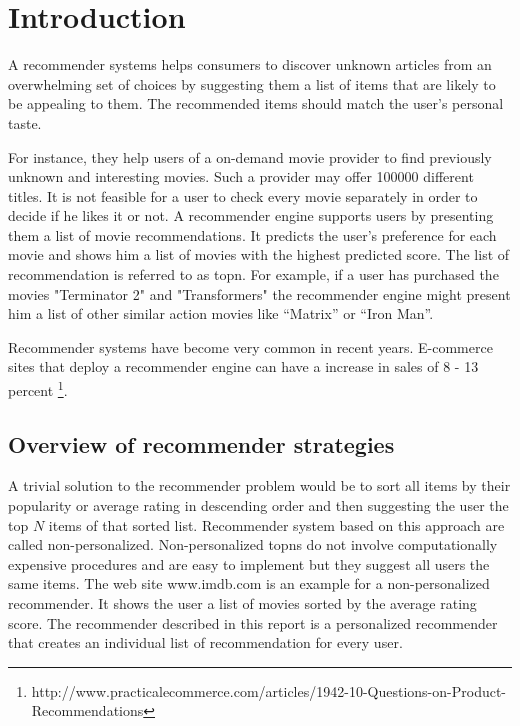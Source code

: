 \section{Introduction}
\label{sec:intro}

A recommender systems helps consumers to discover unknown articles from an overwhelming set of choices by suggesting them a list of items that are likely to be appealing to them. The recommended items should match the user's personal taste.

For instance, they help users of a on-demand movie provider to find previously unknown and interesting movies. Such a provider may offer 100000 different titles. It is not feasible for a user to check every movie separately in order to decide if he likes it or not. A recommender engine supports users by presenting them a list of movie recommendations. It predicts the user's \gls{preference} for each movie and shows him a list of movies with the highest predicted score. The list of recommendation is referred to as \gls{topn}. For example, if a user has purchased the movies "Terminator 2" and "Transformers" the recommender engine might present him a list of other similar action movies like ``Matrix'' or ``Iron Man''. 
 
Recommender systems have become very common in recent years. E-commerce sites that deploy a recommender engine can have a increase in sales of 8 - 13 percent \footnote{http://www.practicalecommerce.com/articles/1942-10-Questions-on-Product-Recommendations}.

\subsection{Overview of recommender strategies}
\label{sec:strategies}

A trivial solution to the recommender problem would be to sort all items by their popularity or average rating in descending order and then suggesting the user the top $N$ items of that sorted list. Recommender system based on this approach are called non-personalized. Non-personalized \glspl{topn} do not involve computationally expensive procedures and are easy to implement but they suggest all users the same items. The web site www.imdb.com is an example for a non-personalized recommender. It shows the user a list of movies sorted by the average rating score.
 The recommender described in this report is a personalized recommender that creates an individual list of recommendation for every user.

